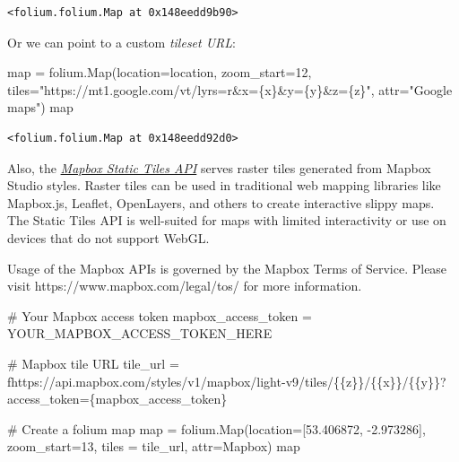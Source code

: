 \documentclass[
  letterpaper,
  DIV=11,
  numbers=noendperiod]{scrreprt}
\newenvironment{Shaded}{\begin{snugshade}}{\end{snugshade}}
\newcommand{\BuiltInTok}[1]{\textcolor[rgb]{0.00,0.23,0.31}{#1}}
\newcommand{\CharTok}[1]{\textcolor[rgb]{0.13,0.47,0.30}{#1}}
\newcommand{\CommentTok}[1]{\textcolor[rgb]{0.37,0.37,0.37}{#1}}
\newcommand{\DecValTok}[1]{\textcolor[rgb]{0.68,0.00,0.00}{#1}}
\newcommand{\FloatTok}[1]{\textcolor[rgb]{0.68,0.00,0.00}{#1}}
\newcommand{\NormalTok}[1]{\textcolor[rgb]{0.00,0.23,0.31}{#1}}
\newcommand{\OperatorTok}[1]{\textcolor[rgb]{0.37,0.37,0.37}{#1}}
\newcommand{\SpecialCharTok}[1]{\textcolor[rgb]{0.37,0.37,0.37}{#1}}
\newcommand{\SpecialStringTok}[1]{\textcolor[rgb]{0.13,0.47,0.30}{#1}}
\newcommand{\StringTok}[1]{\textcolor[rgb]{0.13,0.47,0.30}{#1}}
\begin{document}
\begin{verbatim}
<folium.folium.Map at 0x148eedd9b90>
\end{verbatim}

Or we can point to a custom \emph{tileset URL}:

\begin{Shaded}
\begin{Highlighting}[]
\BuiltInTok{map} \OperatorTok{=}\NormalTok{ folium.Map(location}\OperatorTok{=}\NormalTok{location, zoom\_start}\OperatorTok{=}\DecValTok{12}\NormalTok{, tiles}\OperatorTok{=}\StringTok{"https://mt1.google.com/vt/lyrs=r\&x=}\SpecialCharTok{\{x\}}\StringTok{\&y=}\SpecialCharTok{\{y\}}\StringTok{\&z=}\SpecialCharTok{\{z\}}\StringTok{"}\NormalTok{, attr}\OperatorTok{=}\StringTok{"Google maps"}\NormalTok{)}
\BuiltInTok{map}
\end{Highlighting}
\end{Shaded}

\begin{verbatim}
<folium.folium.Map at 0x148eedd92d0>
\end{verbatim}

Also, the
\href{https://docs.mapbox.com/api/maps/static-tiles/\#:~:text=The\%20Mapbox\%20Static\%20Tiles\%20API,to\%20create\%20interactive\%20slippy\%20maps.}{\emph{Mapbox
Static Tiles API}} serves raster tiles generated from Mapbox Studio
styles. Raster tiles can be used in traditional web mapping libraries
like Mapbox.js, Leaflet, OpenLayers, and others to create interactive
slippy maps. The Static Tiles API is well-suited for maps with limited
interactivity or use on devices that do not support WebGL.

Usage of the Mapbox APIs is governed by the Mapbox Terms of Service.
Please visit https://www.mapbox.com/legal/tos/ for more information.

\begin{Shaded}
\begin{Highlighting}[]
\CommentTok{\# Your Mapbox access token}
\NormalTok{mapbox\_access\_token }\OperatorTok{=} \StringTok{\textquotesingle{}YOUR\_MAPBOX\_ACCESS\_TOKEN\_HERE\textquotesingle{}}

\CommentTok{\# Mapbox tile URL}
\NormalTok{tile\_url }\OperatorTok{=} \SpecialStringTok{f\textquotesingle{}https://api.mapbox.com/styles/v1/mapbox/light{-}v9/tiles/}\CharTok{\{\{}\SpecialStringTok{z}\CharTok{\}\}}\SpecialStringTok{/}\CharTok{\{\{}\SpecialStringTok{x}\CharTok{\}\}}\SpecialStringTok{/}\CharTok{\{\{}\SpecialStringTok{y}\CharTok{\}\}}\SpecialStringTok{?access\_token=}\SpecialCharTok{\{}\NormalTok{mapbox\_access\_token}\SpecialCharTok{\}}\SpecialStringTok{\textquotesingle{}}

\CommentTok{\# Create a folium map}
\BuiltInTok{map} \OperatorTok{=}\NormalTok{ folium.Map(location}\OperatorTok{=}\NormalTok{[}\FloatTok{53.406872}\NormalTok{, }\OperatorTok{{-}}\FloatTok{2.973286}\NormalTok{], zoom\_start}\OperatorTok{=}\DecValTok{13}\NormalTok{, tiles }\OperatorTok{=}\NormalTok{ tile\_url, attr}\OperatorTok{=}\StringTok{\textquotesingle{}Mapbox\textquotesingle{}}\NormalTok{)}
\BuiltInTok{map}
\end{Highlighting}
\end{Shaded}
\end{document}
